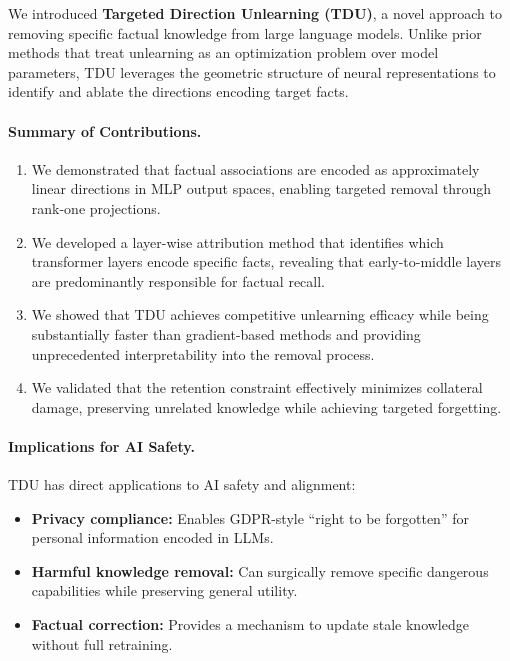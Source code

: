 \label{sec:conclusion}

We introduced \textbf{Targeted Direction Unlearning (TDU)}, a novel approach to removing specific factual knowledge from large language models. Unlike prior methods that treat unlearning as an optimization problem over model parameters, TDU leverages the geometric structure of neural representations to identify and ablate the directions encoding target facts.

\paragraph{Summary of Contributions.}
\begin{enumerate}
    \item We demonstrated that factual associations are encoded as approximately linear directions in MLP output spaces, enabling targeted removal through rank-one projections.
    
    \item We developed a layer-wise attribution method that identifies which transformer layers encode specific facts, revealing that early-to-middle layers are predominantly responsible for factual recall.
    
    \item We showed that TDU achieves competitive unlearning efficacy while being substantially faster than gradient-based methods and providing unprecedented interpretability into the removal process.
    
    \item We validated that the retention constraint effectively minimizes collateral damage, preserving unrelated knowledge while achieving targeted forgetting.
\end{enumerate}

\paragraph{Implications for AI Safety.}
TDU has direct applications to AI safety and alignment:
\begin{itemize}
    \item \textbf{Privacy compliance:} Enables GDPR-style ``right to be forgotten'' for personal information encoded in LLMs.
    \item \textbf{Harmful knowledge removal:} Can surgically remove specific dangerous capabilities while preserving general utility.
    \item \textbf{Factual correction:} Provides a mechanism to update stale knowledge without full retraining.
\end{itemize}

